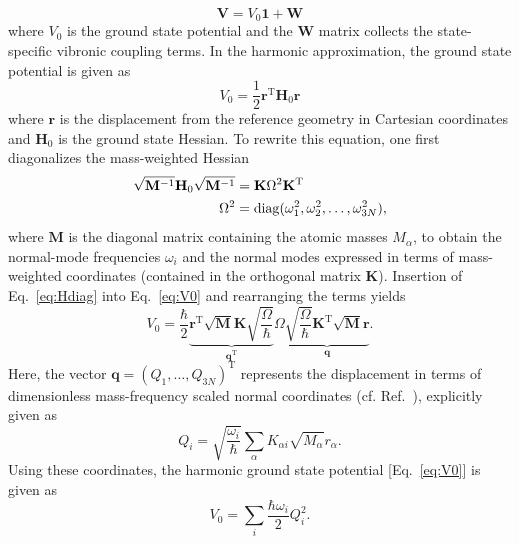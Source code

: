 \documentclass[twoside,twocolumn,9pt]{article}
\newcommand*{\TT}{^{\mathrm{T}}}
\begin{document}
%
%
\begin{equation}
\label{eq:V}
\mathbf{V}=
V_0\mathbf{1}+\mathbf{W}
\end{equation}
%
where $V_0$ is the ground state potential and the $\mathbf{W}$ matrix collects the state-specific vibronic coupling terms.
In the harmonic approximation, the ground state potential is given as
%
\begin{equation}
\label{eq:V0}
V_0=
\frac{1}{2}\mathbf{r}\TT\mathbf{H}_0\mathbf{r}
\end{equation}
%
where $\mathbf{r}$ is the displacement from the reference geometry in Cartesian coordinates and $\mathbf{H}_0$ is the ground state Hessian.
To rewrite this equation, one first diagonalizes the mass-weighted Hessian
%
\begin{align}
\label{eq:Hdiag}
\sqrt{\mathbf{M}^{-1}}\mathbf{H}_0\sqrt{\mathbf{M}^{-1}} &= \mathbf{K}\Omega^2\mathbf{K}^{\rm T}\\
\Omega^2 &= \mathrm{diag}(\omega_1^2, \omega_2^2, \ldots, \omega_{3N}^2)
,
\end{align}
%
where $\mathbf{M}$ is the diagonal matrix containing the atomic masses $M_\alpha$, to obtain the normal-mode frequencies $\omega_i$ and the normal modes expressed in terms of mass-weighted coordinates (contained in the orthogonal matrix $\mathbf{K}$).
Insertion of Eq.~\eqref{eq:Hdiag} into Eq.~\eqref{eq:V0} and rearranging the terms yields
%
\begin{equation}
V_0=
\frac{\hbar}{2}\underbrace{\mathbf{r}\TT\sqrt{\mathbf{M}}\mathbf{K}\sqrt{\frac{\Omega}{\hbar}}}_{\mathbf{q}\TT}
\Omega
\underbrace{\sqrt{\frac{\Omega}{\hbar}}\mathbf{K}\TT\sqrt{\mathbf{M}}\mathbf{r}}_{\mathbf{q}}
.
\end{equation}
%
Here, the vector $\mathbf{q}=(Q_1,\ldots,Q_{3N})\TT$ represents the displacement in terms of dimensionless mass-frequency scaled normal coordinates (cf. Ref.~), explicitly given as
%
\begin{equation}
\label{eq:Qi}
Q_i=\sqrt{\frac{\omega_i}{\hbar}}\sum_\alpha K_{\alpha i}\sqrt{M_\alpha}r_{\alpha}
.
\end{equation}
%
Using these coordinates, the harmonic ground state potential [Eq.~\eqref{eq:V0}] is given as
%
\begin{equation}
\label{eq:V0Qi}
V_0= \sum_i \dfrac{\hbar\omega_i}{2}Q_i^2
.
\end{equation}
\end{document}
